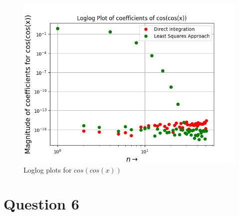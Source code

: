 \documentclass[11pt, a4paper]{article}
\begin{document}
   \begin{figure}[!tbh]
   	\centering
   	\includegraphics[scale=0.6]{Ass4_Figure_10.png}   
   	\caption{Loglog plots for $cos(cos(x))$}
   	\label{fig:sample}
   \end{figure} 
   \cleardoublepage
   
     

\section{Question 6} 
\end{document}
